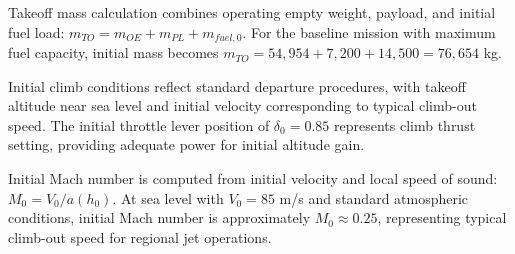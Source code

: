 Takeoff mass calculation combines operating empty weight, payload, and initial fuel load: $m_{TO} = m_{OE} + m_{PL} + m_{fuel,0}$. For the baseline mission with maximum fuel capacity, initial mass becomes $m_{TO} = 54,954 + 7,200 + 14,500 = 76,654$ kg.

Initial climb conditions reflect standard departure procedures, with takeoff altitude near sea level and initial velocity corresponding to typical climb-out speed. The initial throttle lever position of $\delta_0 = 0.85$ represents climb thrust setting, providing adequate power for initial altitude gain.

Initial Mach number is computed from initial velocity and local speed of sound: $M_0 = V_0/a(h_0)$. At sea level with $V_0 = 85$ m/s and standard atmospheric conditions, initial Mach number is approximately $M_0 \approx 0.25$, representing typical climb-out speed for regional jet operations.


